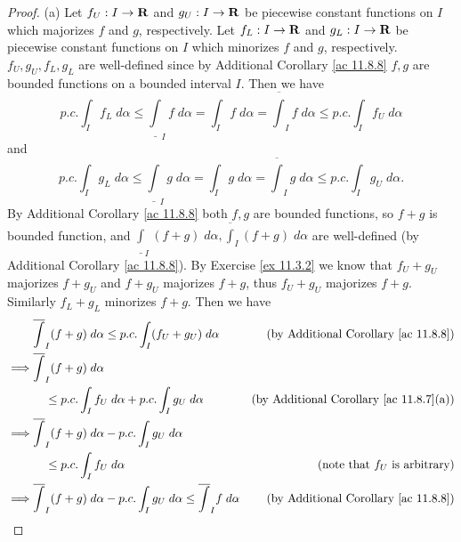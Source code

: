 \begin{proof}{(a)}
    Let \(f_U : I \to \mathbf{R}\) and \(g_U : I \to \mathbf{R}\) be piecewise constant functions on \(I\) which majorizes \(f\) and \(g\), respectively.
    Let \(f_L : I \to \mathbf{R}\) and \(g_L : I \to \mathbf{R}\) be piecewise constant functions on \(I\) which minorizes \(f\) and \(g\), respectively.
    \(f_U, g_U, f_L, g_L\) are well-defined since by Additional Corollary \ref{ac 11.8.8} \(f, g\) are bounded functions on a bounded interval \(I\).
    Then we have
    \[
        p.c. \int_I f_L \; d \alpha \leq \underline{\int}_I f \; d \alpha = \int_I f \; d \alpha = \overline{\int}_I f \; d \alpha \leq p.c. \int_I f_U \; d \alpha
    \]
    and
    \[
        p.c. \int_I g_L \; d \alpha \leq \underline{\int}_I g \; d \alpha = \int_I g \; d \alpha = \overline{\int}_I g \; d \alpha \leq p.c. \int_I g_U \; d \alpha.
    \]
    By Additional Corollary \ref{ac 11.8.8} both \(f, g\) are bounded functions, so \(f + g\) is bounded function, and \(\underline{\int}_I (f + g) \; d \alpha, \overline{\int}_I (f + g) \; d \alpha\) are well-defined (by Additional Corollary \ref{ac 11.8.8}).
    By Exercise \ref{ex 11.3.2} we know that \(f_U + g_U\) majorizes \(f + g_U\) and \(f + g_U\) majorizes \(f + g\), thus \(f_U + g_U\) majorizes \(f + g\).
    Similarly \(f_L + g_L\) minorizes \(f + g\).
    Then we have
    \begin{align*}
                 & \overline{\int}_I (f + g) \; d \alpha \leq p.c. \int_I (f_U + g_U) \; d \alpha                               & \text{(by Additional Corollary \ref{ac 11.8.8})}    \\
        \implies & \overline{\int}_I (f + g) \; d \alpha                                                                                                                              \\
                 & \quad \leq p.c. \int_I f_U \; d \alpha + p.c. \int_I g_U \; d \alpha                                         & \text{(by Additional Corollary \ref{ac 11.8.7}(a))} \\
        \implies & \overline{\int}_I (f + g) \; d \alpha - p.c. \int_I g_U \; d \alpha                                                                                                \\
                 & \quad \leq p.c. \int_I f_U \; d \alpha                                                                       & \text{(note that \(f_U\) is arbitrary)}             \\
        \implies & \overline{\int}_I (f + g) \; d \alpha - p.c. \int_I g_U \; d \alpha \leq \overline{\int}_I f \; d \alpha     & \text{(by Additional Corollary \ref{ac 11.8.8})}    \\

\end{align*}
\end{proof}
